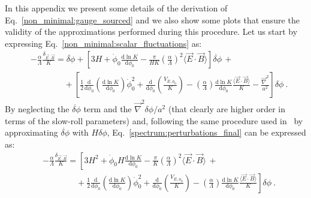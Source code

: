 In this appendix we present some details of the derivation of Eq.~\eqref{non_minimal:gauge_sourced} and we also show some plots that ensure the validity of the approximations performed during this procedure. Let us start by expressing Eq.~\eqref{non_minimal:scalar_fluctuations} as:
\begin{equation}
\begin{aligned}
	\label{spectrum:perturbations_final}
	&-\frac{\alpha}{\Lambda} \frac{\delta_{\vec{E}\cdot \vec{B}}}{K}  = \ddot{\delta\phi} + \left[ 3H + \dot{\phi}_0 \frac{\textrm{d} \ln K}{\textrm{d} \phi_0}   - \frac{\pi}{ H K} \left( \frac{\alpha}{\Lambda} \right)^2  \langle \vec{E} \cdot \vec{B} \rangle \right] \dot{\delta \phi} \, +  \\ 
	&\qquad \qquad + \left[ \frac{1}{2} \frac{\textrm{d}}{\textrm{d} \phi_0} \left(\frac{\textrm{d} \ln K}{\textrm{d} \phi_0}\right) \dot{\phi}_0^{ 2}  + \frac{\textrm{d}}{\textrm{d} \phi_0} \left( \frac{V_{E,\phi_0}}{K}\right) - \left(\frac{\alpha}{\Lambda}\right) \frac{\textrm{d} \ln K}{\textrm{d} \phi_0}   \frac{\langle \vec{E}\cdot \vec{B}\rangle}{K} - \frac{\vec{\nabla}^2}{a^2} \right] \delta \phi \  .
\end{aligned}
\end{equation}
By neglecting the $\ddot{\delta \phi}$ term and the $ \vec{\nabla}^2 \delta \phi /a^2$ (that clearly are higher order in terms of the slow-roll parameters) and, following the same procedure used in~\cite{Linde:2012bt} by approximating $\dot{\delta \phi}$ with $H \delta \phi$, Eq.~\eqref{spectrum:perturbations_final} can be expressed as:
\begin{equation}
\begin{aligned}
	\label{spectrum:perturbations_approx}
	&-\frac{\alpha}{\Lambda} \frac{\delta_{\vec{E}\cdot \vec{B}}}{K}  = \left[ 3H^2 + \dot{\phi}_0 H \frac{\textrm{d} \ln K}{\textrm{d} \phi_0}   - \frac{\pi}{ K} \left( \frac{\alpha}{\Lambda} \right)^2  \langle \vec{E} \cdot \vec{B} \rangle \right.  \, +  \\ 
	&\qquad \qquad + \left. \frac{1}{2} \frac{\textrm{d}}{\textrm{d} \phi_0} \left(\frac{\textrm{d} \ln K}{\textrm{d} \phi_0}\right) \dot{\phi}_0^{ 2}  + \frac{\textrm{d}}{\textrm{d} \phi_0} \left( \frac{V_{E,\phi_0}}{K}\right) - \left(\frac{\alpha}{\Lambda}\right) \frac{\textrm{d} \ln K}{\textrm{d} \phi_0}   \frac{\langle \vec{E}\cdot \vec{B}\rangle}{K} \right] \delta \phi \  .
\end{aligned}
\end{equation}
